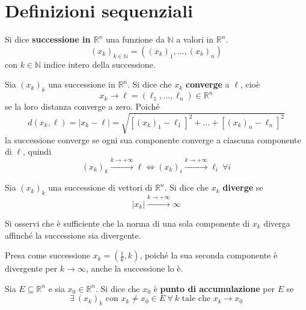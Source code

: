\section{Definizioni sequenziali}
\begin{definition}
    Si dice \textbf{successione in $\mathbb{R}^n$} una funzione da $\mathbb{N}$ a valori in $\mathbb{R}^n$.
    \begin{equation}
        (x_k)_{k \in \mathbb{N}} = ((x_k)_1, \dots, (x_k)_n)  
    \end{equation}
    con $k \in \mathbb{N}$ indice intero della successione.
\end{definition}
\begin{definition}
    Sia $(x_k)_k$ una successione in $\mathbb{R}^n$. Si dice che $x_k$ \textbf{converge} a $\ell$, cioè
    \begin{equation}
        x_k \to \ell=(\ell_1, \dots, \ell_n) \in \mathbb{R}^n
    \end{equation}
    se la loro distanza converge a zero. Poiché 
    \begin{equation}
        d(x_k, \ell)=|x_k-\ell|=\sqrt{[(x_k)_1-\ell_1]^2+\dots+[(x_k)_n-\ell_n]^2}
    \end{equation}
    la successione converge se ogni sua componente converge a ciascuna componente di $\ell$, quindi
    \begin{equation}
        (x_k)_k \overset{k\to+\infty}{\to} \ell \iff (x_k)_i \overset{k\to+\infty}{\to} \ell_i \ \forall i
    \end{equation}
\end{definition}
\begin{definition}
    Sia $(x_k)_k$ una successione di vettori di $\mathbb{R}^n$. Si dice che $x_k$ \textbf{diverge} se
    \begin{equation}
        |x_k| \overset{k\to+\infty}{\to} \infty
    \end{equation}
    \end{definition}
    \begin{oss}
        Si osservi che è sufficiente che la norma di una sola componente di $x_k$ diverga affinché la successione sia divergente.
        \begin{example}
            Presa come successione $x_k=\left(\frac{1}{k}, k\right)$, poiché la sua seconda componente è divergente per $k \to \infty$, anche la successione lo è.
        \end{example}
    \end{oss}
\begin{definition} \label{Def: Punto di accumulazione}
    Sia $E \subseteq \mathbb{R}^n$ e sia $x_0 \in \mathbb{R}^n$. Si dice che $x_0$ è \textbf{punto di accumulazione} per $E$ se
    \begin{equation}
        \exists\ (x_k)_k \text{ con } x_k\neq x_0 \in E \ \forall \ k \text{ tale che } x_k \to x_0
    \end{equation}
\end{definition}
